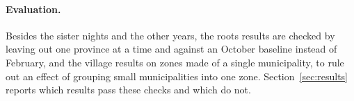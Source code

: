 \paragraph{Evaluation.} Besides the sister nights and the other years, the roots results are checked by leaving out one province at a time and against an October baseline instead of February, and the village results on zones made of a single municipality, to rule out an effect of grouping small municipalities into one zone. Section~\ref{sec:results} reports which results pass these checks and which do not.
